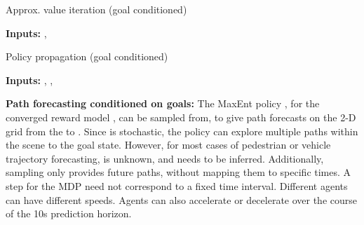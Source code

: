\documentclass[journal]{IEEEtran}
\begin{document}
{\centering
\begin{minipage}{\linewidth}
\begin{algorithm}[H]
  \caption{Approx. value iteration (goal conditioned)}\label{alg:avi_goal}
  \hspace*{\algorithmicindent}\textbf{Inputs:} , 
  \begin{algorithmic}[1]
  \State                
  \For{}
    \State 
    \State 
    \State   
    \State 
  \EndFor

    
  \end{algorithmic}
\end{algorithm}
\end{minipage}
\par
}


{\centering
\begin{minipage}{\linewidth}
\begin{algorithm}[H]
  \caption{Policy propagation (goal conditioned)}\label{alg:svf_goal}
  \hspace*{\algorithmicindent}\textbf{Inputs:} , , 
  \begin{algorithmic}[1]
  \State  
  \State                
  \For{}
    \State 
    \State 
  \EndFor
  \State 
    
  \end{algorithmic}
\end{algorithm}
\end{minipage}
\par
}







\vspace{0.1in}
\noindent \textbf{Path forecasting conditioned on goals:} The MaxEnt policy , for the converged reward model , can be sampled from, to give path forecasts on the 2-D grid from the  to . Since  is stochastic, the policy can explore multiple paths within the scene to the goal state. However, for most cases of pedestrian or vehicle trajectory forecasting,  is unknown, and needs to be inferred. Additionally, sampling  only provides future paths, without mapping them to specific times. A step for the MDP need not correspond to a fixed time interval. Different agents can have different speeds. Agents can also accelerate or decelerate over the course of the 10s prediction horizon.
    
\end{document}
